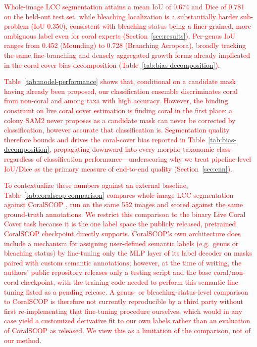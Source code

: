 \documentclass[11pt]{elsarticle}
\newcommand{\revadd}[1]{\textcolor{red}{#1}}
\begin{document}
\revadd{Whole-image LCC segmentation attains a mean IoU of 0.674 and Dice of 0.781 on the held-out test set, while bleaching localization is a substantially harder sub-problem (IoU 0.350), consistent with bleaching status being a finer-grained, more ambiguous label even for coral experts (Section~\ref{sec:results}). Per-genus IoU ranges from 0.452 (Mounding) to 0.728 (Branching Acropora), broadly tracking the same fine-branching and densely aggregated growth forms already implicated in the coral-cover bias decomposition (Table~\ref{tab:bias-decomposition}).}

\revadd{Table~\ref{tab:model-performance} shows that, conditional on a candidate mask having already been proposed, our classification ensemble discriminates coral from non-coral and among taxa with high accuracy. However, the binding constraint on live coral cover estimation is finding coral in the first place: a colony SAM2 never proposes as a candidate mask can never be corrected by classification, however accurate that classification is. Segmentation quality therefore bounds and drives the coral-cover bias reported in Table~\ref{tab:bias-decomposition}, propagating downward into every morpho-taxonomic class regardless of classification performance---underscoring why we treat pipeline-level IoU/Dice as the primary measure of end-to-end quality (Section~\ref{sec:cnn}).}

\revadd{To contextualize these numbers against an external baseline, Table~\ref{tab:coralscop-comparison} compares whole-image LCC segmentation against CoralSCOP \citep{zheng2024}, run on the same 552 images and scored against the same ground-truth annotations. We restrict this comparison to the binary Live Coral Cover task because it is the one label space the publicly released, pretrained CoralSCOP checkpoint directly supports. CoralSCOP's own architecture does include a mechanism for assigning user-defined semantic labels (e.g.\ genus or bleaching status) by fine-tuning only the MLP layer of its label decoder on masks paired with custom semantic annotations; however, at the time of writing, the authors' public repository releases only a testing script and the base coral/non-coral checkpoint, with the training code needed to perform this semantic fine-tuning listed as a pending release. A genus- or bleaching-status-level comparison to CoralSCOP is therefore not currently reproducible by a third party without first re-implementing that fine-tuning procedure ourselves, which would in any case yield a customized derivative fit to our own labels rather than an evaluation of CoralSCOP as released. We view this as a limitation of the comparison, not of our method.}
\end{document}
